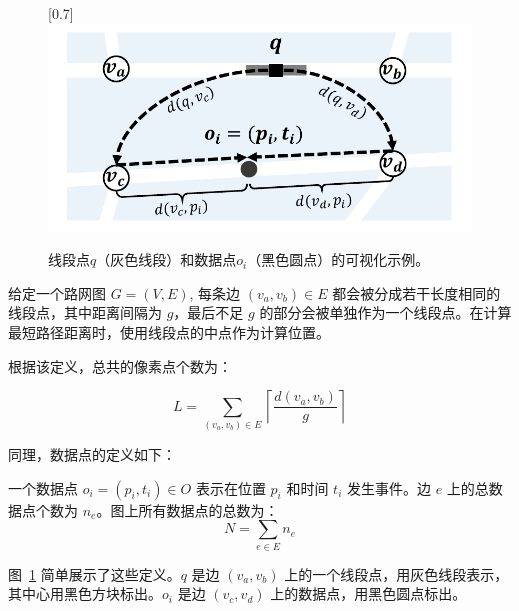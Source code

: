 \begin{figure}[h]\centering
	\scalebox{0.7}[0.7]{\includegraphics{./figures/sec1_intro.pdf}}
	\caption{线段点$q$（灰色线段）和数据点$o_i$（黑色圆点）的可视化示例。}
	\label{fig:sketch}
\end{figure}


\begin{definition}[线段点]
	给定一个路网图 $G = (V, E)$, 每条边 $(v_a,v_b) \in E$ 都会被分成若干长度相同的线段点，其中距离间隔为 $g$，最后不足 $g$ 的部分会被单独作为一个线段点。在计算最短路径距离时，使用线段点的中点作为计算位置。
\end{definition}

根据该定义，总共的像素点个数为：

\begin{equation*}
	L = \sum_{(v_a,v_b) \in E} \left\lceil \frac{d(v_a,v_b)}{g} \right\rceil
\end{equation*}

同理，数据点的定义如下：
\begin{definition}[数据点]
	一个数据点 $o_i=(p_i, t_i) \in O$ 表示在位置 $p_i$ 和时间 $t_i$ 发生事件。边 $e$ 上的总数据点个数为 $n_e$。图上所有数据点的总数为：
	\begin{equation*}
		N = \sum_{e \in E} n_e
	\end{equation*}
\end{definition}


图~\ref{fig:sketch} 简单展示了这些定义。$q$ 是边 $(v_a, v_b)$ 上的一个线段点，用灰色线段表示，其中心用黑色方块标出。$o_i$ 是边 $(v_c, v_d)$ 上的数据点，用黑色圆点标出。

